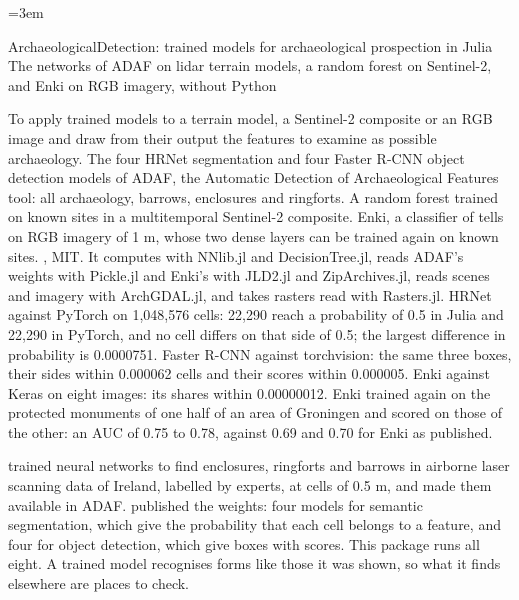 \emergencystretch=3em

  {ArchaeologicalDetection: trained models for archaeological prospection in Julia}
  {The networks of ADAF on lidar terrain models, a random forest on Sentinel-2, and Enki on RGB imagery, without Python}

\factsheet
  {To apply trained models to a terrain model, a Sentinel-2 composite or an RGB image and draw from their output the
   features to examine as possible archaeology.}
  {The four HRNet segmentation and four Faster R-CNN object detection models of ADAF, the Automatic Detection of
   Archaeological Features tool: all archaeology, barrows, enclosures and ringforts. A random forest trained on known
   sites in a multitemporal Sentinel-2 composite. Enki, a classifier of tells on RGB imagery of 1 m, whose two dense
   layers can be trained again on known sites.}
  {, MIT. It computes
   with NNlib.jl and DecisionTree.jl, reads ADAF's weights with Pickle.jl and Enki's with JLD2.jl and ZipArchives.jl,
   reads scenes and imagery with ArchGDAL.jl, and takes rasters read with Rasters.jl.}
  {HRNet against PyTorch on 1,048,576 cells: 22,290 reach a probability of 0.5 in Julia and 22,290 in PyTorch, and no
   cell differs on that side of 0.5; the largest difference in probability is 0.0000751. Faster R-CNN against
   torchvision: the same three boxes, their sides within 0.000062 cells and their scores within 0.000005. Enki
   against Keras on eight images: its shares within 0.00000012. Enki trained again on the protected monuments of
   one half of an area of Groningen and scored on those of the other: an AUC of 0.75 to 0.78, against 0.69 and 0.70
   for Enki as published.}

 trained neural networks to find enclosures, ringforts and
barrows in airborne laser scanning data of Ireland, labelled by experts, at cells of 0.5 m, and made them available in
ADAF.  published the weights: four models
for semantic segmentation, which give the probability that each cell belongs to a feature, and four for object
detection, which give boxes with scores. This package runs all eight. A trained model recognises
forms like those it was shown, so what it finds elsewhere are places to check.

